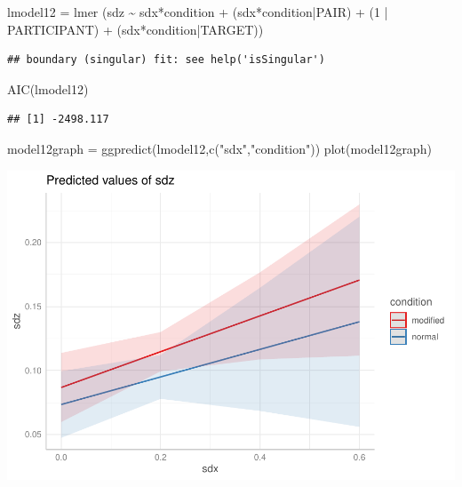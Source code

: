 \documentclass[
]{article}
\newenvironment{Shaded}{\begin{snugshade}}{\end{snugshade}}
\newcommand{\DecValTok}[1]{\textcolor[rgb]{0.00,0.00,0.81}{#1}}
\newcommand{\FunctionTok}[1]{\textcolor[rgb]{0.00,0.00,0.00}{#1}}
\newcommand{\NormalTok}[1]{#1}
\newcommand{\OtherTok}[1]{\textcolor[rgb]{0.56,0.35,0.01}{#1}}
\newcommand{\SpecialCharTok}[1]{\textcolor[rgb]{0.00,0.00,0.00}{#1}}
\newcommand{\StringTok}[1]{\textcolor[rgb]{0.31,0.60,0.02}{#1}}
\begin{document}
\begin{Shaded}
\begin{Highlighting}[]
\NormalTok{lmodel12 }\OtherTok{=}  \FunctionTok{lmer}\NormalTok{ (sdz }\SpecialCharTok{\textasciitilde{}}\NormalTok{   sdx}\SpecialCharTok{*}\NormalTok{condition }\SpecialCharTok{+}\NormalTok{ (sdx}\SpecialCharTok{*}\NormalTok{condition}\SpecialCharTok{|}\NormalTok{PAIR) }\SpecialCharTok{+}\NormalTok{ (}\DecValTok{1} \SpecialCharTok{|}\NormalTok{ PARTICIPANT) }\SpecialCharTok{+}\NormalTok{ (sdx}\SpecialCharTok{*}\NormalTok{condition}\SpecialCharTok{|}\NormalTok{TARGET))}
\end{Highlighting}
\end{Shaded}

\begin{verbatim}
## boundary (singular) fit: see help('isSingular')
\end{verbatim}

\begin{Shaded}
\begin{Highlighting}[]
\FunctionTok{AIC}\NormalTok{(lmodel12)}
\end{Highlighting}
\end{Shaded}

\begin{verbatim}
## [1] -2498.117
\end{verbatim}

\begin{Shaded}
\begin{Highlighting}[]
\NormalTok{model12graph }\OtherTok{=} \FunctionTok{ggpredict}\NormalTok{(lmodel12,}\FunctionTok{c}\NormalTok{(}\StringTok{"sdx"}\NormalTok{,}\StringTok{"condition"}\NormalTok{))}
\FunctionTok{plot}\NormalTok{(model12graph)}
\end{Highlighting}
\end{Shaded}

\includegraphics{Report_files/figure-latex/pressure2-1.pdf}
\end{document}
